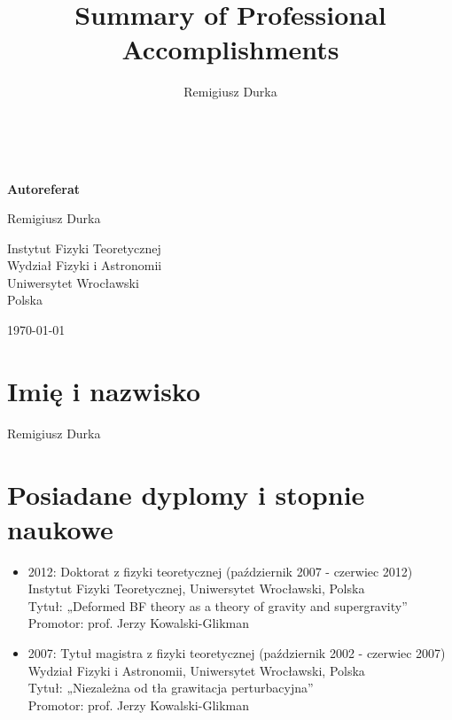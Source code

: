\documentclass[12pt,a4paper]{article}
\title{Summary of Professional Accomplishments}
\author{Remigiusz Durka}
\begin{document}
	

\begin{center}
		~~\\[4cm]
		\LARGE
		{\Huge \textbf{Autoreferat}\par}
		\vspace{4cm}
		{\huge Remigiusz Durka}\par
		\vspace{3cm}
		\par
		\begin{minipage}{.5\linewidth}
	\normalsize\centering
	{\large Instytut Fizyki Teoretycznej\\[5pt]
		\large Wydział Fizyki i Astronomii\\[5pt]
		\large Uniwersytet Wrocławski\\[6pt]
		\large Polska}
\end{minipage}
\vfill
\footnotesize{{\today} }
\end{center}
\newpage
\normalsize	
\newpage
\small
\tableofcontents
\normalsize
\newpage


\section{Imię i nazwisko}
Remigiusz Durka
\section{Posiadane dyplomy i stopnie naukowe}
\begin{itemize}
	\item 2012: Doktorat z fizyki teoretycznej (październik 2007 - czerwiec 2012)\\
	Instytut Fizyki Teoretycznej, Uniwersytet Wrocławski, Polska\\
	Tytuł: „Deformed BF theory as a theory of gravity and supergravity”\\
	Promotor: prof. Jerzy Kowalski-Glikman
	\item 2007: Tytuł magistra z fizyki teoretycznej (październik 2002 - czerwiec 2007)\\
	Wydział Fizyki i Astronomii, Uniwersytet Wrocławski, Polska\\
	Tytuł: „Niezależna od tła grawitacja perturbacyjna”\\
	Promotor: prof. Jerzy Kowalski-Glikman
\end{itemize}
\end{document}
